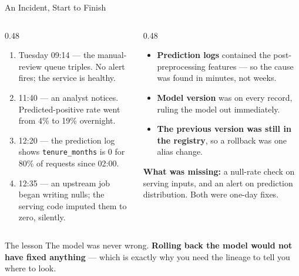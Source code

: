 \begin{frame}{An Incident, Start to Finish}

    \begin{columns}[T]
        \begin{column}{0.48\textwidth}
            \begin{tcolorbox}[colback=red!5, colframe=red!50, title=\scriptsize What happened]
                \scriptsize
                \begin{enumerate}
                    \item Tuesday 09:14 --- the manual-review queue triples. No alert fires; the service is
                          healthy.
                    \item 11:40 --- an analyst notices. Predicted-positive rate went from 4\% to 19\%
                          overnight.
                    \item 12:20 --- the prediction log shows \texttt{tenure\_months} is $0$ for 80\% of
                          requests since 02:00.
                    \item 12:35 --- an upstream job began writing nulls; the serving code imputed them to
                          zero, silently.
                \end{enumerate}
            \end{tcolorbox}
        \end{column}
        \begin{column}{0.48\textwidth}
            \begin{tcolorbox}[colback=green!5, colframe=green!50!black, title=\scriptsize What made it survivable]
                \scriptsize
                \begin{itemize}
                    \item \textbf{Prediction logs} contained the post-preprocessing features --- so the cause
                          was found in minutes, not weeks.
                    \item \textbf{Model version} was on every record, ruling the model out immediately.
                    \item \textbf{The previous version was still in the registry}, so a rollback was one
                          alias change.
                \end{itemize}
                \vspace{0.09em}
                \textbf{What was missing:} a null-rate check on serving inputs, and an alert on prediction
                distribution. Both were one-day fixes.
            \end{tcolorbox}
        \end{column}
    \end{columns}

    \vspace{0.18em}
    \begin{alertblock}{The lesson}
        The model was never wrong. \textbf{Rolling back the model would not have fixed anything} --- which is
        exactly why you need the lineage to tell you where to look.
    \end{alertblock}

\end{frame}

